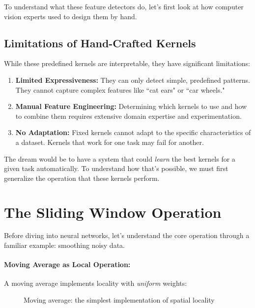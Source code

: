\documentclass{article}
\begin{document}
To understand what these feature detectors do, let's first look at how computer vision experts used to design them by hand.






\subsection{Limitations of Hand-Crafted Kernels}
While these predefined kernels are interpretable, they have significant limitations:
\begin{enumerate}
    \item \textbf{Limited Expressiveness:} They can only detect simple, predefined patterns. They cannot capture complex features like ``cat ears" or ``car wheels."
    \item \textbf{Manual Feature Engineering:} Determining which kernels to use and how to combine them requires extensive domain expertise and experimentation.
    \item \textbf{No Adaptation:} Fixed kernels cannot adapt to the specific characteristics of a dataset. Kernels that work for one task may fail for another.
\end{enumerate}
The dream would be to have a system that could \textit{learn} the best kernels for a given task automatically. To understand how that's possible, we must first generalize the operation that these kernels perform.





\section{The Sliding Window Operation}

Before diving into neural networks, let's understand the core operation through a familiar example: smoothing noisy data.

\paragraph{Moving Average as Local Operation:}

A moving average implements locality with \emph{uniform} weights:

\begin{figure}[h]
\centering
{}
\caption{Moving average: the simplest implementation of spatial locality}
\end{figure}
\end{document}
